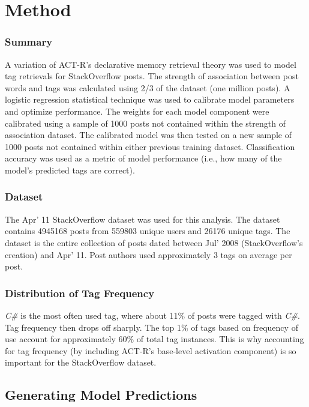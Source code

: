 \documentclass[10pt,letterpaper]{article}
\begin{document}
\section{Method}

\subsubsection{Summary}

A variation of ACT-R's declarative memory retrieval theory \cite{Anderson2004} was used to model tag retrievals for StackOverflow posts.
The strength of association between post words and tags was calculated using 2/3 of the dataset (one million posts).
A logistic regression statistical technique was used to calibrate model parameters and optimize performance.
The weights for each model component were calibrated using a sample of \num{1000} posts not contained within the strength of association dataset.
The calibrated model was then tested on a new sample of \num{1000} posts not contained within either previous training dataset.
Classification accuracy was used as a metric of model performance (i.e., how many of the model's predicted tags are correct).

\subsubsection{Dataset}

The Apr' 11 StackOverflow dataset \cite{DataDump2011} was used for this analysis.
The dataset contains \num{4945168} posts from \num{559803} unique users and \num{26176} unique tags.
The dataset is the entire collection of posts dated between Jul' 2008 (StackOverflow's creation) and Apr' 11.
Post authors used approximately 3 tags on average per post.

\subsubsection{Distribution of Tag Frequency}
\emph{C\#} is the most often used tag, where about 11\% of posts were tagged with \emph{C\#}.
Tag frequency then drops off sharply.
The top 1\% of tags based on frequency of use account for approximately 60\% of total tag instances.
This is why accounting for tag frequency (by including ACT-R's base-level activation component) is so important for the StackOverflow dataset.

\subsection{Generating Model Predictions}
\end{document}

